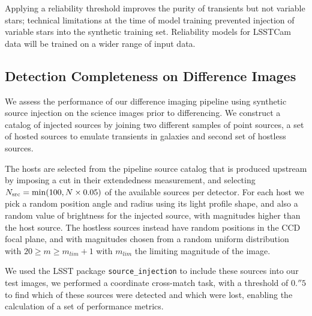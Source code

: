 Applying a reliability threshold improves the purity of transients but not variable stars; technical limitations at the time of model training prevented injection of variable stars into the synthetic training set.
Reliability models for \gls{LSSTCam} data will be trained on a wider range of input data.

\subsection{Detection Completeness on Difference Images} 
\label{sec:perf:dia_completeness}

We assess the performance of our difference imaging \gls{pipeline} using synthetic source injection on the science images prior to differencing.
We construct a catalog of injected sources by joining two different samples of point sources, a set of hosted sources to emulate transients in galaxies and second set of hostless sources.

The hosts are selected from the \gls{pipeline} source catalog that is produced upstream by imposing a cut in their extendedness measurement, and selecting $N_{\rm src}={\rm min}(100, N\times0.05)$ of the available sources per detector.
%
%
For each host we pick a random position angle and radius using its light profile \gls{shape}, and also a random value of brightness for the injected source, with magnitudes higher than the host source.
The hostless sources instead have random positions in the \gls{CCD} focal plane, and with magnitudes chosen from a random uniform distribution with $20 \geq m \geq m_{lim} + 1$  with $m_{lim}$ the limiting magnitude of the image.

We used the \gls{LSST} package \texttt{source\_injection} to include these sources into our test images, we performed a coordinate cross-match task, with a threshold of $0.''5$ to find which of these sources were detected and which were lost, enabling the calculation of a set of performance metrics.


